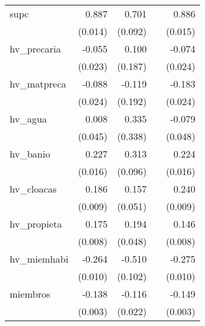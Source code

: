 {\begin{longtable}{l*{4}{D{.}{.}{-1}}}
\addlinespace
supc        &       0.887\sym{***}&       0.701\sym{***}&                     &       0.886\sym{***}\\
            &     (0.014)         &     (0.092)         &                     &     (0.015)         \\
\addlinespace
hv\_precaria &      -0.055\sym{*}  &       0.100         &                     &      -0.074\sym{**} \\
            &     (0.023)         &     (0.187)         &                     &     (0.024)         \\
\addlinespace
hv\_matpreca &      -0.088\sym{***}&      -0.119         &                     &      -0.183\sym{***}\\
            &     (0.024)         &     (0.192)         &                     &     (0.024)         \\
\addlinespace
hv\_agua     &       0.008         &       0.335         &                     &      -0.079         \\
            &     (0.045)         &     (0.338)         &                     &     (0.048)         \\
\addlinespace
hv\_banio    &       0.227\sym{***}&       0.313\sym{**} &                     &       0.224\sym{***}\\
            &     (0.016)         &     (0.096)         &                     &     (0.016)         \\
\addlinespace
hv\_cloacas  &       0.186\sym{***}&       0.157\sym{**} &                     &       0.240\sym{***}\\
            &     (0.009)         &     (0.051)         &                     &     (0.009)         \\
\addlinespace
hv\_propieta &       0.175\sym{***}&       0.194\sym{***}&                     &       0.146\sym{***}\\
            &     (0.008)         &     (0.048)         &                     &     (0.008)         \\
\addlinespace
hv\_miemhabi &      -0.264\sym{***}&      -0.510\sym{***}&                     &      -0.275\sym{***}\\
            &     (0.010)         &     (0.102)         &                     &     (0.010)         \\
\addlinespace
miembros    &      -0.138\sym{***}&      -0.116\sym{***}&                     &      -0.149\sym{***}\\
            &     (0.003)         &     (0.022)         &                     &     (0.003)         \\

\end{longtable}}
